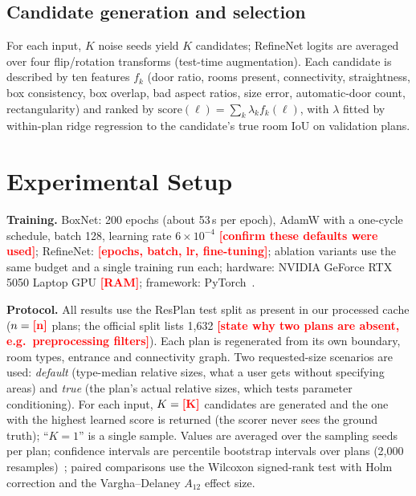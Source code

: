 \documentclass[conference]{IEEEtran}
\newcommand{\todo}[1]{\textcolor{red}{\textbf{[#1]}}}
\begin{document}
\subsection{Candidate generation and selection}
For each input, $K$ noise seeds yield $K$ candidates; RefineNet logits are averaged over four flip/rotation transforms (test-time augmentation). Each candidate is described by ten features $f_k$ (door ratio, rooms present, connectivity, straightness, box consistency, box overlap, bad aspect ratios, size error, automatic-door count, rectangularity) and ranked by $\mathrm{score}(\ell)=\sum_k\lambda_k f_k(\ell)$, with $\lambda$ fitted by within-plan ridge regression to the candidate's true room IoU on validation plans.

\section{Experimental Setup}
\textbf{Training.} BoxNet: 200 epochs (about 53\,s per epoch), AdamW with a one-cycle schedule, batch 128, learning rate $6\times10^{-4}$ \todo{confirm these defaults were used}; RefineNet: \todo{epochs, batch, lr, fine-tuning}; ablation variants use the same budget and a single training run each; hardware: NVIDIA GeForce RTX 5050 Laptop GPU \todo{RAM}; framework: PyTorch~\cite{paszke2019pytorch}.

\textbf{Protocol.} All results use the ResPlan test split as present in our processed cache ($n=\resN$ plans; the official split lists 1{,}632 \todo{state why two plans are absent, e.g.\ preprocessing filters}). Each plan is regenerated from its own boundary, room types, entrance and connectivity graph. Two requested-size scenarios are used: \emph{default} (type-median relative sizes, what a user gets without specifying areas) and \emph{true} (the plan's actual relative sizes, which tests parameter conditioning). For each input, $K=\resK$ candidates are generated and the one with the highest learned score is returned (the scorer never sees the ground truth); ``$K{=}1$'' is a single sample. Values are averaged over the sampling seeds per plan; confidence intervals are percentile bootstrap intervals over plans (2{,}000 resamples)~\cite{efron1979bootstrap}; paired comparisons use the Wilcoxon signed-rank test with Holm correction and the Vargha--Delaney $A_{12}$ effect size.
\end{document}
